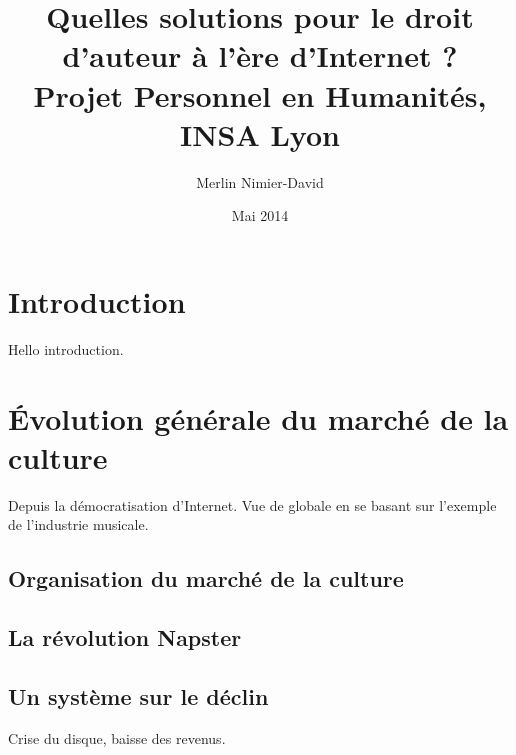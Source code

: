 \documentclass[a4paper]{report}
\title{
	Quelles solutions pour le droit d'auteur à l'ère d'Internet ?\\
	Projet Personnel en Humanités, INSA Lyon
}
\author{Merlin Nimier-David}
\date{Mai 2014}
\begin{document}
	\maketitle

	\tableofcontents




	\chapter{Introduction}

	Hello introduction.




	\chapter{Évolution générale du marché de la culture}
	Depuis la démocratisation d'Internet. Vue de globale en se basant sur l'exemple de l'industrie musicale.


	\section{Organisation du marché de la culture}


	\section{La révolution Napster}


	\section{Un système sur le déclin}
	Crise du disque, baisse des revenus.
\end{document}
